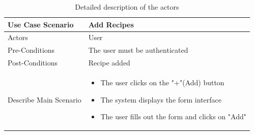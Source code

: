 \documentclass{article}
\begin{document}
{{\begin{table}[h]
    \centering
    \begin{tabularx}{\textwidth}{X|X}
        \toprule
        Use Case Scenario & Add Recipes \\
        \midrule
        Actors & User \\
        \midrule
        Pre-Conditions & The user must be authenticated \\
        \midrule
        Post-Conditions & Recipe added  \\
        \midrule
        Describe Main Scenario &  \begin{itemize}[label=$\bullet$]
            \item The user clicks on the "+"(Add) button
            \item The system displays the form interface
            \item The user fills out the form and clicks on "Add"
        \end{itemize} \\
        \bottomrule
    \end{tabularx}
    \caption{Detailed description of the actors}
    \label{tab:actors_roles}
\end{table}



}}
\end{document}
